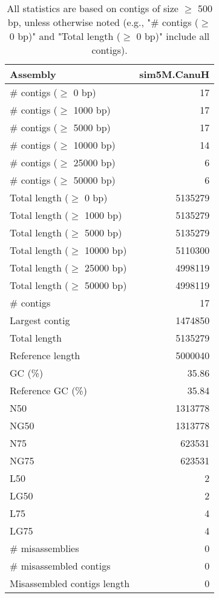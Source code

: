 \documentclass[12pt,a4paper]{article}
\begin{document}
\begin{table}[ht]
\begin{center}
\caption{All statistics are based on contigs of size $\geq$ 500 bp, unless otherwise noted (e.g., "\# contigs ($\geq$ 0 bp)" and "Total length ($\geq$ 0 bp)" include all contigs).}
\begin{tabular}{|l*{1}{|r}|}
\hline
Assembly & sim5M.CanuH \\ \hline
\# contigs ($\geq$ 0 bp) & 17 \\ \hline
\# contigs ($\geq$ 1000 bp) & 17 \\ \hline
\# contigs ($\geq$ 5000 bp) & 17 \\ \hline
\# contigs ($\geq$ 10000 bp) & 14 \\ \hline
\# contigs ($\geq$ 25000 bp) & 6 \\ \hline
\# contigs ($\geq$ 50000 bp) & 6 \\ \hline
Total length ($\geq$ 0 bp) & 5135279 \\ \hline
Total length ($\geq$ 1000 bp) & 5135279 \\ \hline
Total length ($\geq$ 5000 bp) & 5135279 \\ \hline
Total length ($\geq$ 10000 bp) & 5110300 \\ \hline
Total length ($\geq$ 25000 bp) & 4998119 \\ \hline
Total length ($\geq$ 50000 bp) & 4998119 \\ \hline
\# contigs & 17 \\ \hline
Largest contig & 1474850 \\ \hline
Total length & 5135279 \\ \hline
Reference length & 5000040 \\ \hline
GC (\%) & 35.86 \\ \hline
Reference GC (\%) & 35.84 \\ \hline
N50 & 1313778 \\ \hline
NG50 & 1313778 \\ \hline
N75 & 623531 \\ \hline
NG75 & 623531 \\ \hline
L50 & 2 \\ \hline
LG50 & 2 \\ \hline
L75 & 4 \\ \hline
LG75 & 4 \\ \hline
\# misassemblies & 0 \\ \hline
\# misassembled contigs & 0 \\ \hline
Misassembled contigs length & 0 \\ \hline

\end{tabular}
\end{center}
\end{table}
\end{document}
